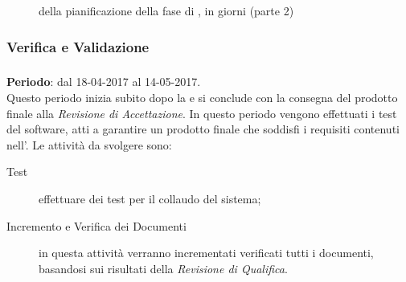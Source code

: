 \begin{figure}[H]
\label{tab:ganttpa1}
\caption{ della pianificazione della fase di \PDC, in giorni (parte 2)}
\end{figure}


	\subsubsection{Verifica e Validazione} \label{sec:VV}

	\subsubsection{\VV} \label{sec:VV}
	\textbf{Periodo}: dal 18-04-2017 al 14-05-2017.
	\\ Questo periodo inizia subito dopo la \PDC{} e si conclude con la consegna del prodotto finale alla \emph{Revisione di Accettazione}. In questo periodo vengono effettuati i test del software, atti a garantire un prodotto finale che soddisfi i requisiti contenuti nell'\AR. Le attività da svolgere sono:
	\begin{description}
		\item[Test] effettuare dei test per il collaudo del sistema;
		\item[Incremento e Verifica dei Documenti] in questa attività verranno incrementati verificati tutti i documenti, basandosi sui risultati della \emph{Revisione di Qualifica}.
	\end{description}		
	
